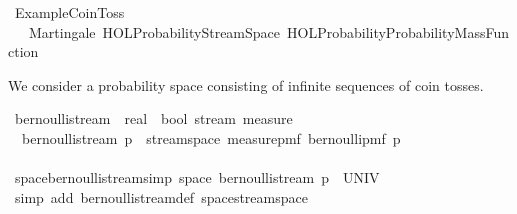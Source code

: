 %
\begin{isabellebody}%
%
%
\isadelimtheory
\isanewline
\isanewline
%
\endisadelimtheory
%
\isatagtheory
{}\isamarkupfalse%
\ Example{\isacharunderscore}{\kern0pt}Coin{\isacharunderscore}{\kern0pt}Toss\isanewline
\ \ \ Martingale\ {\isachardoublequoteopen}HOL{\isacharminus}{\kern0pt}Probability{\isachardot}{\kern0pt}Stream{\isacharunderscore}{\kern0pt}Space{\isachardoublequoteclose}\ {\isachardoublequoteopen}HOL{\isacharminus}{\kern0pt}Probability{\isachardot}{\kern0pt}Probability{\isacharunderscore}{\kern0pt}Mass{\isacharunderscore}{\kern0pt}Function{\isachardoublequoteclose}\isanewline
{}%
\endisatagtheory
{\isafoldtheory}%
%
\isadelimtheory
%
\endisadelimtheory
%
\begin{isamarkuptext}%
We consider a probability space consisting of infinite sequences of coin tosses.%
\end{isamarkuptext}\isamarkuptrue%
\isamarkupfalse%
\ bernoulli{\isacharunderscore}{\kern0pt}stream\ {\isacharcolon}{\kern0pt}{\isacharcolon}{\kern0pt}\ {\isachardoublequoteopen}real\ {\isasymRightarrow}\ {\isacharparenleft}{\kern0pt}bool\ stream{\isacharparenright}{\kern0pt}\ measure{\isachardoublequoteclose}\ \isanewline
\ \ {\isachardoublequoteopen}bernoulli{\isacharunderscore}{\kern0pt}stream\ p\ {\isacharequal}{\kern0pt}\ stream{\isacharunderscore}{\kern0pt}space\ {\isacharparenleft}{\kern0pt}measure{\isacharunderscore}{\kern0pt}pmf\ {\isacharparenleft}{\kern0pt}bernoulli{\isacharunderscore}{\kern0pt}pmf\ p{\isacharparenright}{\kern0pt}{\isacharparenright}{\kern0pt}{\isachardoublequoteclose}\isanewline
\ \ \ \ \ \ \ \ \ \ \ \ \ \ \ \ \ \ \ \ \ \ \ \ \ \ \ \ \ \ \ \ \ \ \isanewline
{}\isamarkupfalse%
\ space{\isacharunderscore}{\kern0pt}bernoulli{\isacharunderscore}{\kern0pt}stream{\isacharbrackleft}{\kern0pt}simp{\isacharbrackright}{\kern0pt}{\isacharcolon}{\kern0pt}\ {\isachardoublequoteopen}space\ {\isacharparenleft}{\kern0pt}bernoulli{\isacharunderscore}{\kern0pt}stream\ p{\isacharparenright}{\kern0pt}\ {\isacharequal}{\kern0pt}\ UNIV{\isachardoublequoteclose}%
\isadelimproof
\ %
\endisadelimproof
%
\isatagproof
{}\isamarkupfalse%
\ {\isacharparenleft}{\kern0pt}simp\ add{\isacharcolon}{\kern0pt}\ bernoulli{\isacharunderscore}{\kern0pt}stream{\isacharunderscore}{\kern0pt}def\ space{\isacharunderscore}{\kern0pt}stream{\isacharunderscore}{\kern0pt}space{\isacharparenright}{\kern0pt}%

\end{isabellebody}
